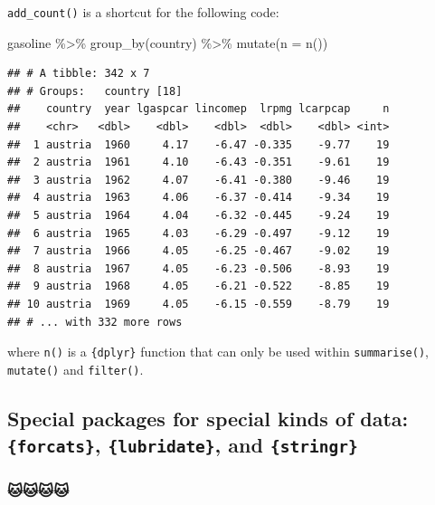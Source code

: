 \documentclass[
]{article}
\newenvironment{Shaded}{\begin{snugshade}}{\end{snugshade}}
\newcommand{\AttributeTok}[1]{\textcolor[rgb]{0.77,0.63,0.00}{#1}}
\newcommand{\FunctionTok}[1]{\textcolor[rgb]{0.00,0.00,0.00}{#1}}
\newcommand{\NormalTok}[1]{#1}
\newcommand{\SpecialCharTok}[1]{\textcolor[rgb]{0.00,0.00,0.00}{#1}}
\begin{document}
\texttt{add\_count()} is a shortcut for the following code:

\begin{Shaded}
\begin{Highlighting}[]
\NormalTok{gasoline }\SpecialCharTok{\%\textgreater{}\%}
  \FunctionTok{group\_by}\NormalTok{(country) }\SpecialCharTok{\%\textgreater{}\%}
  \FunctionTok{mutate}\NormalTok{(}\AttributeTok{n =} \FunctionTok{n}\NormalTok{())}
\end{Highlighting}
\end{Shaded}

\begin{verbatim}
## # A tibble: 342 x 7
## # Groups:   country [18]
##    country  year lgaspcar lincomep  lrpmg lcarpcap     n
##    <chr>   <dbl>    <dbl>    <dbl>  <dbl>    <dbl> <int>
##  1 austria  1960     4.17    -6.47 -0.335    -9.77    19
##  2 austria  1961     4.10    -6.43 -0.351    -9.61    19
##  3 austria  1962     4.07    -6.41 -0.380    -9.46    19
##  4 austria  1963     4.06    -6.37 -0.414    -9.34    19
##  5 austria  1964     4.04    -6.32 -0.445    -9.24    19
##  6 austria  1965     4.03    -6.29 -0.497    -9.12    19
##  7 austria  1966     4.05    -6.25 -0.467    -9.02    19
##  8 austria  1967     4.05    -6.23 -0.506    -8.93    19
##  9 austria  1968     4.05    -6.21 -0.522    -8.85    19
## 10 austria  1969     4.05    -6.15 -0.559    -8.79    19
## # ... with 332 more rows
\end{verbatim}

where \texttt{n()} is a \texttt{\{dplyr\}} function that can only be used within \texttt{summarise()}, \texttt{mutate()} and
\texttt{filter()}.

\hypertarget{special-packages-for-special-kinds-of-data-forcats-lubridate-and-stringr}{%
\subsection{\texorpdfstring{Special packages for special kinds of data: \texttt{\{forcats\}}, \texttt{\{lubridate\}}, and \texttt{\{stringr\}}}{Special packages for special kinds of data: \{forcats\}, \{lubridate\}, and \{stringr\}}}\label{special-packages-for-special-kinds-of-data-forcats-lubridate-and-stringr}}

\hypertarget{section}{%
\subsubsection{🐱🐱🐱🐱}\label{section}}
\end{document}
